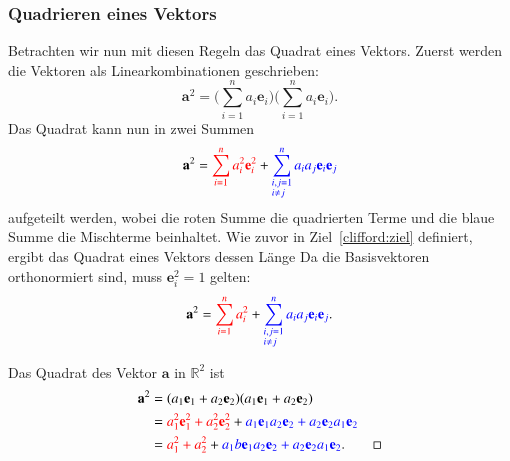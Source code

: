 \subsubsection{Quadrieren eines Vektors}
%
Betrachten wir nun mit diesen Regeln das Quadrat eines Vektors.
Zuerst werden die Vektoren als Linearkombinationen geschrieben:
\begin{equation}
	    \textbf{a}^2 = 
		\biggl( 
		\sum_{i=1}^{n} a_i \textbf{e}_i 
		\biggr) 
		\biggl( 
		\sum_{i=1}^{n} a_i \textbf{e}_i 
		\biggr)
		\label{eq:quad_a_1}.
\end{equation}
Das Quadrat kann nun in zwei Summen 
\begin{equation}
	\textbf{a}^2 =
	\textcolor{red}{\sum_{i=1}^{n} a_i^2\textbf{e}_i^2} 
	+ 
	\textcolor{blue}{\sum_{\begin{subarray}{l}i,j=1\\i \neq j\end{subarray}}^n  a_ia_j\textbf{e}_i\textbf{e}_j } 
	\label{eq:quad_a_2}
\end{equation}
aufgeteilt werden, wobei die roten Summe die quadrierten Terme und die blaue Summe die Mischterme beinhaltet.
Wie zuvor in Ziel~\ref{clifford:ziel} definiert, ergibt das Quadrat eines Vektors dessen Länge
 Da die Basisvektoren orthonormiert sind, muss $\textbf{e}_i^2 = 1$ gelten:
\begin{equation}
	\textbf{a}^2 = \textcolor{red}{\sum_{i=1}^{n} a_i^2} + \textcolor{blue}{\sum_{\begin{subarray}{l}i,j=1\\i \neq j\end{subarray}}^n  a_ia_j\textbf{e}_i\textbf{e}_j}.
	\label{eq:quad_a_3}
\end{equation}
\begin{beispiel}
Das Quadrat des Vektor $\textbf{a}$ in $\mathbb{R}^2$ ist
\begin{align*}
    \textbf{a}^2 
    &= (a_1\textbf{e}_1+a_2\textbf{e}_2)(a_1\textbf{e}_1+a_2\textbf{e}_2) \\
    &= \textcolor{red}{a_1^2\textbf{e}_1^2 + a_2^2\textbf{e}_2^2} 
    + \textcolor{blue}{a_1\textbf{e}_1a_2\textbf{e}_2 + a_2\textbf{e}_2a_1\textbf{e}_2}   \\
    & = \textcolor{red}{a_1^2 + a_2^2} + \textcolor{blue}{a_1b\textbf{e}_1a_2\textbf{e}_2 + a_2\textbf{e}_2a_1\textbf{e}_2}.
\qedhere
\end{align*}
\end{beispiel}


